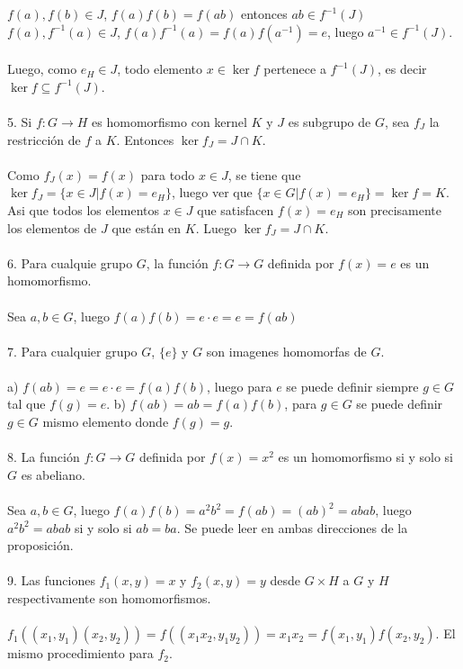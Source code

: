 \documentclass{article}
\begin{document}
$f(a),f(b) \in J$, $f(a)f(b)=f(ab)$ entonces $ab \in f^{-1}(J)$
\\
$f(a),f^{-1}(a) \in J$, $f(a)f^{-1}(a)=f(a)f(a^{-1})=e$, luego $a^{-1} \in f^{-1}(J)$.
\\
\\
Luego, como $e_{H} \in J$, todo elemento $x \in \ker{f}$ pertenece a $f^{-1}(J)$, es decir $\ker{f} \subseteq f^{-1}(J)$.
\\
\\
5. Si $f: G \to H$ es homomorfismo con kernel $K$ y $J$ es subgrupo de $G$, sea $f_{J}$ la restricción de $f$ a $K$. Entonces $\ker{f_{J}}=J \cap K$.
\\
\\
Como $f_{J}(x)=f(x)$ para todo $x \in J$, se tiene que $\ker{f_{J}}=\{x \in J | f(x)=e_{H} \}$, luego ver que $\{x \in G |f(x)=e_{H}\}=\ker{f}=K$. Asi que todos los elementos $x \in J$ que satisfacen $f(x) = e_{H}$ son precisamente los elementos de $J$ que están en $K$. Luego $\ker{f_{J}}=J \cap K$.
\\
\\
6. Para cualquie grupo $G$, la función $f: G \to G$ definida por $f(x)=e$ es un homomorfismo.
\\
\\
Sea $a,b \in G$, luego $f(a)f(b)=e\cdot e=e=f(ab)$
\\
\\
7. Para cualquier grupo $G$, $\{e\}$ y $G$ son imagenes homomorfas de $G$.
\\
\\
a) $f(ab)=e=e\cdot e=f(a)f(b)$, luego para $e$ se puede definir siempre $g \in G$ tal que $f(g)=e$.
b) $f(ab)=ab=f(a)f(b)$, para $g \in G$ se puede definir $g \in G$ mismo elemento donde $f(g)=g$.
\\
\\
8. La función $f: G \to G$ definida por $f(x)=x^2$ es un homomorfismo si y solo si $G$ es abeliano.
\\
\\
Sea $a,b \in G$, luego $f(a)f(b)=a^{2}b^{2}=f(ab)=(ab)^{2}=abab$, luego $a^{2}b^{2}=abab$ si y solo si $ab=ba$. Se puede leer en ambas direcciones de la proposición.
\\
\\
9. Las funciones $f_{1}(x,y)=x$ y $f_{2}(x,y)=y$ desde $G \times H$ a $G$ y $H$ respectivamente son homomorfismos.
\\
\\
$f_{1}((x_1,y_1)(x_2,y_2))=f((x_1x_2,y_1y_2))=x_1x_2=f(x_1,y_1)f(x_2,y_2)$. El mismo procedimiento para $f_2$.
\end{document}
